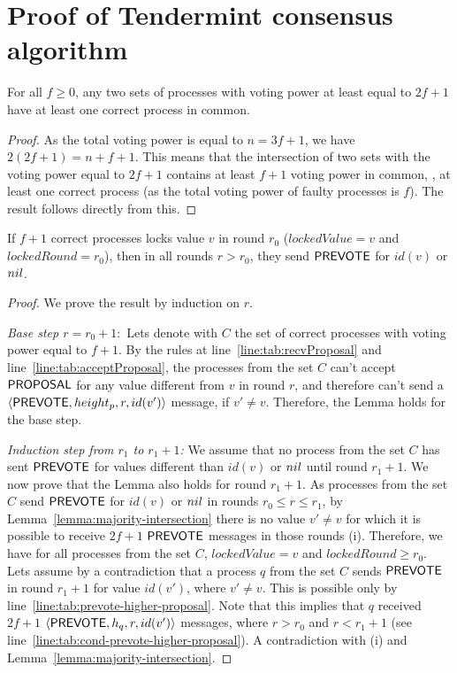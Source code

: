 \section{Proof of Tendermint consensus algorithm}
\label{sec:proof}

\begin{lemma}
	\label{lemma:majority-intersection}
	For all $f\geq 0$, any two sets of processes with voting power at least equal to $2f+1$ have
	at least one correct process in common.
\end{lemma}

\begin{proof}
	As the total voting power is equal to $n=3f+1$, we have $2(2f+1) = n+f+1$.
	This means that the intersection of two sets with the voting power equal to $2f+1$ contains at least $f+1$ voting power in common, \ie, at least one correct process (as the total voting power of faulty processes is $f$). The result follows directly from this.
\end{proof}

\begin{lemma}
	\label{lemma:locked-decision_value-prevote-v}
	If $f+1$ correct processes locks value $v$ in round $r_0$ ($lockedValue = v$ and $lockedRound = r_0$), then in all rounds $r > r_0$, they send $\mathsf{PREVOTE}$ for $id(v)$ or $nil$.
\end{lemma}

\begin{proof}
We prove the result by induction on $r$.

\emph{Base step $r = r_0 + 1:$} Lets denote with $C$ the set of correct processes with voting power equal to $f+1$. 
By the rules at line~\ref{line:tab:recvProposal} and line~\ref{line:tab:acceptProposal}, the processes from the set $C$ can't accept $\mathsf{PROPOSAL}$ for any value different from $v$ in round $r$, and therefore can't send a $\langle\mathsf{PREVOTE},height_p, r,id(v')\rangle$ message,
if $v' \neq v$. Therefore, the Lemma holds for the base step.

\emph{Induction step from $r_1$ to $r_1+1$:} We assume that no process from the set $C$ has sent $\mathsf{PREVOTE}$ for values different than $id(v)$ or $nil$ until round $r_1 + 1$. We now prove that 
the Lemma also holds for round $r_1 + 1$. As processes from the set $C$ send $\mathsf{PREVOTE}$ for $id(v)$ or $nil$ in rounds $r_0 \le r \le r_1$, by Lemma~\ref{lemma:majority-intersection}
there is no value $v' \neq v$ for which it is possible to receive $2f+1$ $\mathsf{PREVOTE}$ messages in those rounds (i). Therefore, we have for all processes from the set $C$, $lockedValue = v$ and $lockedRound \ge r_0$.   
Lets assume by a contradiction that a process $q$ from the set $C$ sends $\mathsf{PREVOTE}$ in round $r_1 + 1$ for value $id(v')$, where $v' \neq v$. This is possible only by line~\ref{line:tab:prevote-higher-proposal}. 
Note that this implies that $q$ received $2f+1$ $\langle\mathsf{PREVOTE},h_q, r,id(v')\rangle$ messages, where $r > r_0$ and $r < r_1 +1$ (see line~\ref{line:tab:cond-prevote-higher-proposal}). A contradiction with (i) and Lemma~\ref{lemma:majority-intersection}.  	
\end{proof}	

